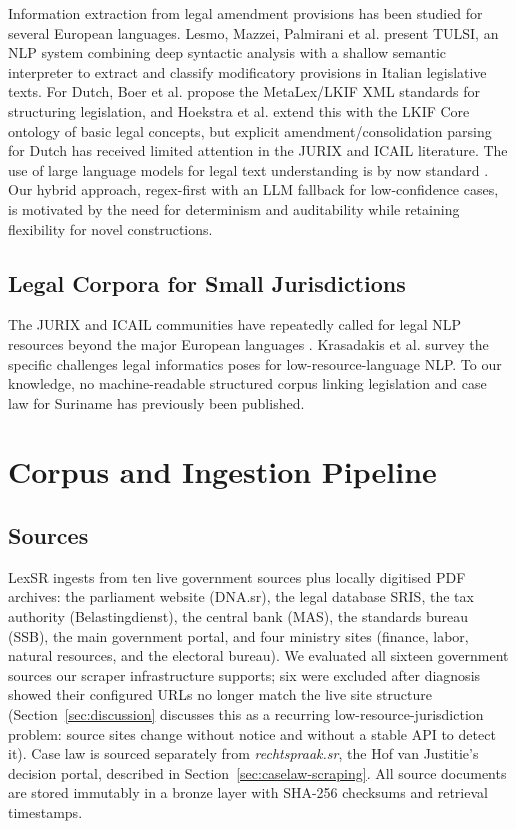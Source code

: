 \documentclass{IOS-Book-Article}
\begin{document}
Information extraction from legal amendment provisions has been studied for several European
languages. Lesmo, Mazzei, Palmirani et al. \cite{tulsi2013} present TULSI, an NLP system
combining deep syntactic analysis with a shallow semantic interpreter to extract and classify
modificatory provisions in Italian legislative texts. For Dutch, Boer et al. \cite{boer2007}
propose the MetaLex/LKIF XML standards for structuring legislation, and Hoekstra et al.
\cite{hoekstra2007} extend this with the LKIF Core ontology of basic legal concepts, but
explicit amendment/consolidation parsing for Dutch has received limited attention in the
JURIX and ICAIL literature. The use of large language models for
legal text understanding is by now standard \cite{chalkidis2020,koreeda2021}. Our hybrid
approach, regex-first with an LLM fallback for low-confidence cases, is motivated by the need for determinism and auditability while retaining flexibility for novel
constructions.

\subsection{Legal Corpora for Small Jurisdictions}

The JURIX and ICAIL communities have repeatedly called for legal NLP
resources beyond the major European languages \cite{niklaus2024}. Krasadakis et al.
\cite{krasadakis2024} survey the specific challenges legal informatics poses for
low-resource-language NLP. To our knowledge, no
machine-readable structured corpus linking legislation and case law for Suriname has
previously been published.

\section{Corpus and Ingestion Pipeline}
\label{sec:corpus}

\subsection{Sources}

LexSR ingests from ten live government sources plus locally digitised PDF archives: the
parliament website (DNA.sr), the legal database SRIS, the tax authority (Belastingdienst),
the central bank (MAS), the standards bureau (SSB), the main government portal, and four
ministry sites (finance, labor, natural resources, and the electoral bureau). We evaluated
all sixteen government sources our scraper infrastructure supports; six were excluded after
diagnosis showed their configured URLs no longer match the live site structure
(Section~\ref{sec:discussion} discusses this as a recurring low-resource-jurisdiction problem: source
sites change without notice and without a stable API to detect it). Case law is sourced separately from
\emph{rechtspraak.sr}, the Hof van Justitie's decision portal, described in Section~\ref{sec:caselaw-scraping}. All
source documents are stored immutably in a bronze layer with SHA-256 checksums and retrieval
timestamps.
\end{document}
